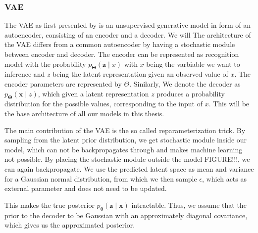 \subsubsection{VAE}



The VAE as first presented by \cite{kingma_auto-encoding_2014} is an unsupervised generative model in form of an autoencoder, consisting of an encoder and a decoder. We will The architecture of the VAE differs from a common autoencoder by having a stochastic module between encoder and decoder. The encoder can be represented as recognition model with the probability $p_{\boldsymbol{\Theta}}(\mathbf{z} \mid x)$ with $x$ being the varbiable we want to inference and $z$ being the latent representation given an observed value of $x$. The encoder parameters are represented by $\Theta$. Sinilarly, We denote the decoder as $p_{\boldsymbol{\Theta}}(\mathbf{x} \mid z)$, which given a latent representation $z$ produces a probability distribution for the possible values, corresponding to the input of $x$. This will be the base architecture of all our models in this thesis.

The main contribution of the VAE is the so called reparameterization trick. By sampling from the latent prior distribution, we get stochastic module inside our model, which can not be backpropagates through and makes machine learning not possible. By placing the stochastic module outside the model FIGURE!!!, we can again backpropagate. We use the predicted latent space as mean and variance for a Gaussian normal distribution, from which we then sample $\epsilon$, which acts as external parameter and does not need to be updated.

This makes the true posterior $p_{\boldsymbol{\theta}}(\mathbf{z} \mid \mathbf{x})$ intractable. Thus, we assume that the prior to the decoder to be Gaussian with an approximately diagonal covariance, which gives us the approximated posterior.

